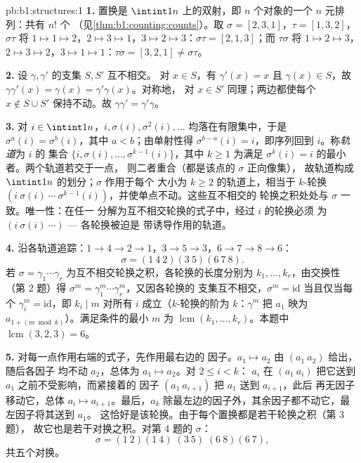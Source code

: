 \begin{solution}{pb:b1:structures:1}
\textbf{1.} 置换是 $\intint1n$ 上的双射，即
$n$ 个对象的一个 $n$ 元排列：共有 $n!$ 个
（见\cref{thm:b1:counting:counts}）。取 $\sigma = [2,3,1]$，$\tau =
[1,3,2]$，$\sigma\tau$ 将 $1 \mapsto 1 \mapsto 2$，$2 \mapsto 3
\mapsto 1$，$3 \mapsto 2 \mapsto 3$：$\sigma\tau = [2,1,3]$；而
$\tau\sigma$ 将 $1 \mapsto 2 \mapsto 3$，$2 \mapsto 3 \mapsto
2$，$3 \mapsto 1 \mapsto 1$：$\tau\sigma = [3,2,1] \neq
\sigma\tau$。

\textbf{2.} 设 $\gamma, \gamma'$ 的支集 $S, S'$ 互不相交。
对 $x \in S$，有 $\gamma'(x) = x$ 且 $\gamma(x) \in S$，故
$\gamma\gamma'(x) = \gamma(x) = \gamma'\gamma(x)$。对称地，
对 $x \in S'$ 同理；两边都使每个 $x \notin S \cup S'$ 保持不动。故
$\gamma\gamma' = \gamma'\gamma$。

\textbf{3.} 对 $i \in \intint1n$，$i, \sigma(i),
\sigma^2(i), \dots$ 均落在有限集中，于是 $\sigma^a(i) =
\sigma^b(i)$，其中 $a < b$；由单射性得 $\sigma^{b-a}(i)
= i$，即序列回到 $i$。称\emph{轨道}为 $i$ 的
集合 $\{i, \sigma(i), \dots, \sigma^{k-1}(i)\}$，其中 $k \geq 1$
为满足 $\sigma^k(i) = i$ 的最小者。两个轨道若交于一点，
则二者重合（都是该点的 $\sigma$ 正向像集），
故轨道构成 $\intint1n$ 的划分；$\sigma$ 作用于每个
大小为 $k \geq 2$ 的轨道上，相当于 $k$-轮换 $(i\ \sigma(i)\ \cdots\
\sigma^{k-1}(i))$，并使单点不动。这些互不相交的
轮换之积处处与 $\sigma$ 一致。唯一性：在任一
分解为互不相交轮换的式子中，经过 $i$ 的轮换必须
为 $(i\ \sigma(i)\ \cdots)$ --- 各轮换被迫是
带诱导作用的轨道。

\textbf{4.} 沿各轨道追踪：$1 \to 4 \to 2 \to 1$，$3 \to 5
\to 3$，$6 \to 7 \to 8 \to 6$：
\[
\sigma = (1\ 4\ 2)(3\ 5)(6\ 7\ 8) .
\]
若 $\sigma = \gamma_1\cdots\gamma_r$ 为互不相交轮换之积，各轮换的长度分别为
$k_1, \dots, k_r$，由交换性（第 2 题）得
$\sigma^m = \gamma_1^m\cdots\gamma_r^m$，又因各轮换的
支集互不相交，$\sigma^m = \mathrm{id}$ 当且仅当每个 $\gamma_i^m =
\mathrm{id}$，即 $k_i \mid m$ 对所有 $i$ 成立（$k$-轮换的阶为
$k$：$\gamma^m$ 把 $a_1$ 映为 $a_{1 + (m \bmod k)}$）。满足条件的最小
$m$ 为 $\operatorname{lcm}(k_1, \dots, k_r)$。本题中
$\operatorname{lcm}(3, 2, 3) = 6$。

\textbf{5.} 对每一点作用右端的式子，先作用最右边的
因子。$a_1 \mapsto a_2$ 由 $(a_1\ a_2)$ 给出，随后各因子
均不动 $a_2$，总体为 $a_1 \mapsto a_2$。对 $2 \leq i < k$：
$a_i$ 在 $(a_1\ a_i)$ 把它送到 $a_1$ 之前不受影响，而紧接着的
因子 $(a_1\ a_{i+1})$ 把 $a_1$ 送到 $a_{i+1}$，此后
再无因子移动它，总体 $a_i \mapsto a_{i+1}$。最后，$a_k$
除最左边的因子外，其余因子都不动它，最左因子将其送到 $a_1$。
这恰好是该轮换。由于每个置换都是若干轮换之积（第 3 题），
故它也是若干对换之积。对第 4 题的
$\sigma$：
\[
\sigma = (1\ 2)(1\ 4)\;(3\ 5)\;(6\ 8)(6\ 7),
\]
共五个对换。


\end{solution}
